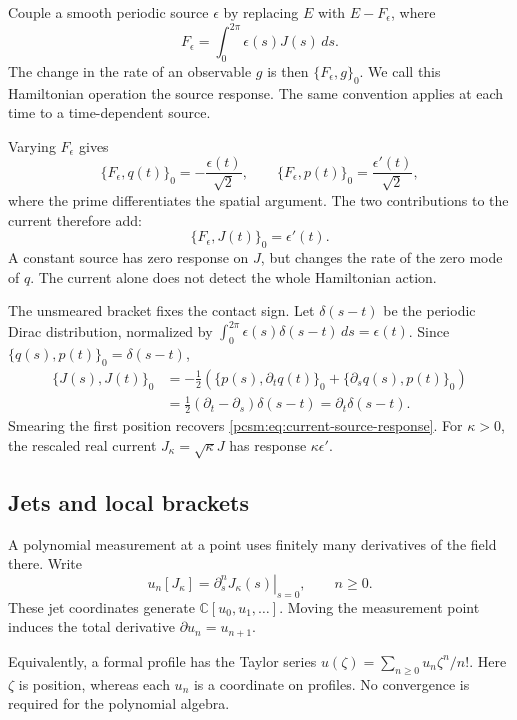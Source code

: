 Couple a smooth periodic source \(\epsilon\) by replacing \(E\) with
\(E-F_\epsilon\), where
\[
 F_\epsilon=\int_0^{2\pi}\epsilon(s)J(s)\,ds.
\]
The change in the rate of an observable \(g\) is then
\(\{F_\epsilon,g\}_0\).
We call this Hamiltonian operation the source response.
The same convention applies at each time to a time-dependent source.

Varying \(F_\epsilon\) gives
\[
 \{F_\epsilon,q(t)\}_0=-\frac{\epsilon(t)}{\sqrt2},\qquad
 \{F_\epsilon,p(t)\}_0=\frac{\epsilon'(t)}{\sqrt2},
\]
where the prime differentiates the spatial argument.
The two contributions to the current therefore add:
\begin{equation}\label{pcsm:eq:current-source-response}
 \{F_\epsilon,J(t)\}_0=\epsilon'(t).
\end{equation}
A constant source has zero response on \(J\), but changes the rate of
the zero mode of \(q\). The current alone does not detect the whole
Hamiltonian action.

The\label{pcsm:def:periodic-contact} unsmeared bracket fixes the contact sign.
Let \(\delta(s-t)\) be the periodic Dirac distribution, normalized by
\(\int_0^{2\pi}\epsilon(s)\delta(s-t)\,ds=\epsilon(t)\).
Since \(\{q(s),p(t)\}_0=\delta(s-t)\),
\begin{align*}
 \{J(s),J(t)\}_0
 &=-\frac12\left(\{p(s),\partial_tq(t)\}_0
                  +\{\partial_sq(s),p(t)\}_0\right)\\
 &=\frac12(\partial_t-\partial_s)\delta(s-t)
   =\partial_t\delta(s-t).
\end{align*}
Smearing the first position recovers
\eqref{pcsm:eq:current-source-response}.
For \(\kappa>0\), the rescaled real current
\(J_\kappa=\sqrt\kappa J\) has response \(\kappa\epsilon'\).

\subsection{Jets and local brackets}

A polynomial measurement at a point uses finitely many derivatives
of the field there. Write
\[
 u_n[J_\kappa]=\left.\partial_s^nJ_\kappa(s)\right|_{s=0},
 \qquad n\geq0.
\]
These jet coordinates generate \(\mathbb C[u_0,u_1,\ldots]\).
Moving the measurement point induces the total derivative
\(\partial u_n=u_{n+1}\).

Equivalently, a formal profile has the Taylor series
\(u(\zeta)=\sum_{n\geq0}u_n\zeta^n/n!\).
Here \(\zeta\) is position, whereas each \(u_n\) is a coordinate
on profiles. No convergence is required for the polynomial algebra.

